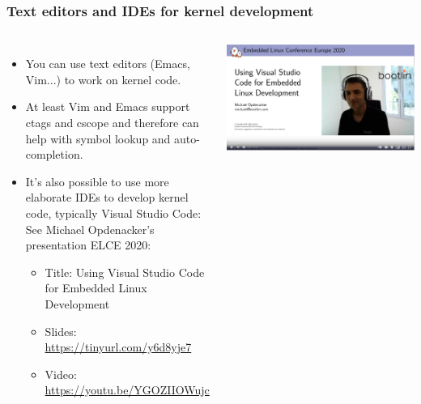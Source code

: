 \begin{frame}
  \frametitle{Text editors and IDEs for kernel development}
  \begin{columns}
    \begin{itemize}
    \item You can use text editors (Emacs, Vim...) to work on kernel code.
    \item At least Vim and Emacs support ctags and cscope and therefore
          can help with symbol lookup and auto-completion.
    \item It's also possible to use more elaborate IDEs to develop
          kernel code, typically Visual Studio Code:
          See Michael Opdenacker's presentation ELCE 2020:
          \begin{itemize}
          \item Title: Using Visual Studio Code for Embedded Linux Development
          \item Slides: \url{https://tinyurl.com/y6d8yje7}
          \item Video: \url{https://youtu.be/YGOZIIOWujc}
          \end{itemize}
    \end{itemize}
    \includegraphics[width=\textwidth]{common/opdenacker-using-vscode.jpg}
  \end{columns}
\end{frame}
